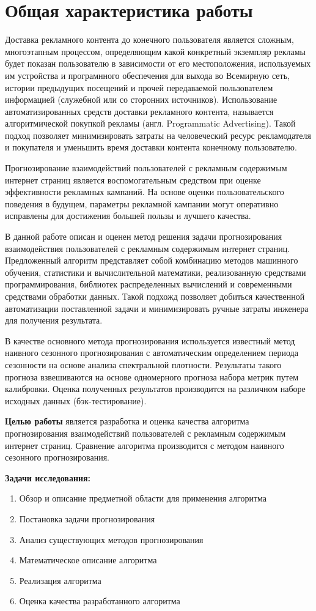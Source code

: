 \section{Общая характеристика работы}

Доставка рекламного контента до конечного пользователя является сложным, многоэтапным процессом, определяющим
какой конкретный экземпляр рекламы будет показан пользователю в зависимости от его местоположения,
используемых им устройства и програмнного обеспечения для выхода во Всемирную сеть, истории предыдущих
посещений и прочей передаваемой пользователем информацией (служебной или со сторонних источников). Использование
автоматизированных средств доставки рекламного контента, называется алгоритмической покупкой рекламы (англ.
Programmatic Advertising). Такой подход позволяет минимизировать затраты на человеческий ресурс рекламодателя и
покупателя и уменьшить время доставки контента конечному пользователю.

Прогнозирование взаимодействий пользователей с рекламным содержимым интернет страниц является воспомогательным
средством при оценке эффективности рекламных кампаний. На основе оценки пользовательского поведения в будущем,
параметры рекламной кампании могут оперативно исправлены для достижения большей пользы и лучшего качества.

В данной работе описан и оценен метод решения задачи прогнозирования взаимодействия пользователей с рекламным 
содержимым интернет страниц. Предложенный алгоритм представляет собой комбинацию методов машинного обучения, 
статистики и вычислительной математики, реализованную средствами программирования, библиотек распределенных
вычислений и современными средствами обработки данных. Такой подхожд позволяет добиться качественной 
автоматизации поставленной задачи и минимизировать ручные затраты инженера для получения результата.

В качестве основного метода прогнозирования используется известный метод наивного сезонного
прогнозирования с автоматическим определением периода сезонности на основе анализа спектральной плотности.
Результаты такого прогноза взвешиваются на основе одномерного прогноза набора метрик путем калибровки. 
Оценка полученных результатов производится на различном наборе исходных данных (бэк-тестирование).

\textbf{Целью работы} является разработка и оценка качества алгоритма прогнозирования взаимодействий пользователей
с рекламным содержимым интернет страниц. Сравнение алгоритма производится с методом наивного сезонного 
прогнозирования.

\textbf{Задачи исследования:}
\begin{enumerate}
    \item Обзор и описание предметной области для применения алгоритма
    \item Постановка задачи прогнозирования
    \item Анализ существующих методов прогнозирования
    \item Математическое описание алгоритма
    \item Реализация алгоритма
    \item Оценка качества разработанного алгоритма
\end{enumerate}